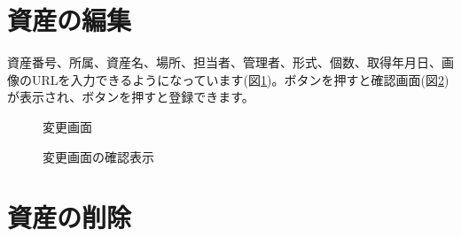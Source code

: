 \documentclass[11ptm]{jsarticle}
\begin{document}
\section{資産の編集}
\label{sec:資産の編集}
資産番号、所属、資産名、場所、担当者、管理者、形式、個数、取得年月日、画像のURLを入力できるようになっています(図\ref{fig:変更画面})。ボタンを押すと確認画面(図\ref{fig:変更画面の確認表示})が表示され、ボタンを押すと登録できます。\par
\begin{figure}[h]
  \centering
  \caption{\label{fig:変更画面}変更画面}
\end{figure}
\begin{figure}[h]
  \centering
  \caption{\label{fig:変更画面の確認表示}変更画面の確認表示}
\end{figure}


\section{資産の削除}
\label{sec:資産の削除}
\end{document}
